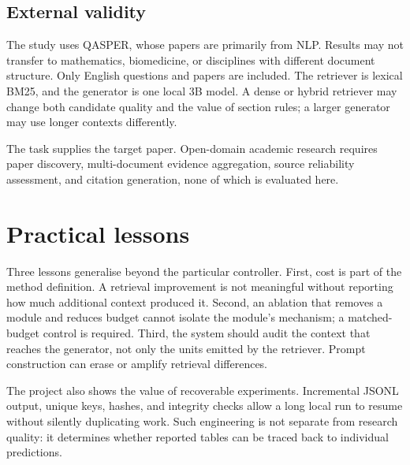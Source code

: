 \subsection{External validity}

The study uses QASPER, whose papers are primarily from NLP. Results may not transfer to mathematics, biomedicine, or disciplines with different document structure. Only English questions and papers are included. The retriever is lexical BM25, and the generator is one local 3B model. A dense or hybrid retriever may change both candidate quality and the value of section rules; a larger generator may use longer contexts differently.

The task supplies the target paper. Open-domain academic research requires paper discovery, multi-document evidence aggregation, source reliability assessment, and citation generation, none of which is evaluated here.

\section{Practical lessons}

Three lessons generalise beyond the particular controller. First, cost is part of the method definition. A retrieval improvement is not meaningful without reporting how much additional context produced it. Second, an ablation that removes a module and reduces budget cannot isolate the module's mechanism; a matched-budget control is required. Third, the system should audit the context that reaches the generator, not only the units emitted by the retriever. Prompt construction can erase or amplify retrieval differences.

The project also shows the value of recoverable experiments. Incremental JSONL output, unique keys, hashes, and integrity checks allow a long local run to resume without silently duplicating work. Such engineering is not separate from research quality: it determines whether reported tables can be traced back to individual predictions.


